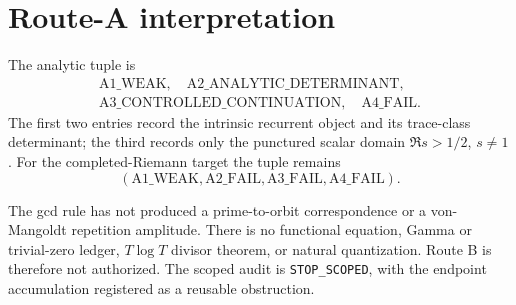 \section{Route-A interpretation}

The analytic tuple is
\[
\begin{gathered}
\mathrm{A1\_WEAK},\quad \mathrm{A2\_ANALYTIC\_DETERMINANT},\\
\mathrm{A3\_CONTROLLED\_CONTINUATION},\quad \mathrm{A4\_FAIL}.
\end{gathered}
\]
The first two entries record the intrinsic recurrent object and its
trace-class determinant; the third records only the punctured scalar domain
\(\Re s>1/2\), \(s\ne1\).  For the completed-Riemann target the tuple remains
\[
(\mathrm{A1\_WEAK},\mathrm{A2\_FAIL},\mathrm{A3\_FAIL},\mathrm{A4\_FAIL}).
\]

The gcd rule has not produced a prime-to-orbit correspondence or a
von-Mangoldt repetition amplitude.  There is no functional equation, Gamma or
trivial-zero ledger, \(T\log T\) divisor theorem, or natural quantization.
Route B is therefore not authorized.  The scoped audit is
\texttt{STOP\_SCOPED}, with
the endpoint accumulation registered as a reusable obstruction.
